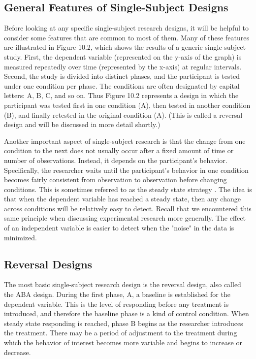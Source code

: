 \subsection{General Features of Single-Subject Designs}

Before looking at any specific single-subject research designs, it will be helpful to consider some features that are common to most of them. Many of these features are illustrated in Figure 10.2, which shows the results of a generic single-subject study. First, the dependent variable (represented on the y-axis of the graph) is measured repeatedly over time (represented by the x-axis) at regular intervals. Second, the study is divided into distinct phases, and the participant is tested under one condition per phase. The conditions are often designated by capital letters: A, B, C, and so on. Thus Figure 10.2 represents a design in which the participant was tested first in one condition (A), then tested in another condition (B), and finally retested in the original condition (A). (This is called a reversal design and will be discussed in more detail shortly.)

Another important aspect of single-subject research is that the change from one condition to the next does not usually occur after a fixed amount of time or number of observations. Instead, it depends on the participant's behavior. Specifically, the researcher waits until the participant's behavior in one condition becomes fairly consistent from observation to observation before changing conditions. This is sometimes referred to as the steady state strategy \citep{sidman_tactics_1960}. The idea is that when the dependent variable has reached a steady state, then any change across conditions will be relatively easy to detect. Recall that we encountered this same principle when discussing experimental research more generally. The effect of an independent variable is easier to detect when the "noise" in the data is minimized.

\subsection{Reversal Designs}

The most basic single-subject research design is the reversal design, also called the ABA design. During the first phase, A, a baseline is established for the dependent variable. This is the level of responding before any treatment is introduced, and therefore the baseline phase is a kind of control condition. When steady state responding is reached, phase B begins as the researcher introduces the treatment. There may be a period of adjustment to the treatment during which the behavior of interest becomes more variable and begins to increase or decrease.



